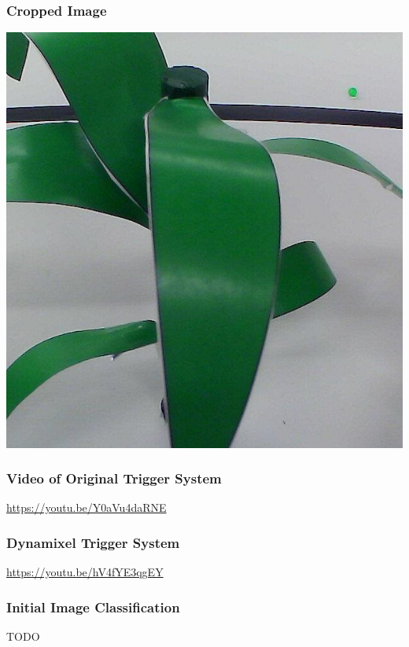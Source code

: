 \documentclass[11pt, twoside]{report}
\begin{document}
\subsubsection{Cropped Image} \label{app:crop}
	\begin{center}
	\includegraphics[scale=.2]{cropped.jpg}
	\end{center}
	
\subsubsection{Video of Original Trigger System} \label{app:ogtrig}
	\begin{center}
	\url{https://youtu.be/Y0aVu4daRNE}
	\end{center}

\subsubsection{Dynamixel Trigger System} \label{app:dyntrig}
	\begin{center}
	\url{https://youtu.be/hV4fYE3qgEY}
	\end{center}

\subsubsection{Initial Image Classification} \label{app:ogimg}
	\begin{center}
	TODO
	\end{center}
\end{document}
